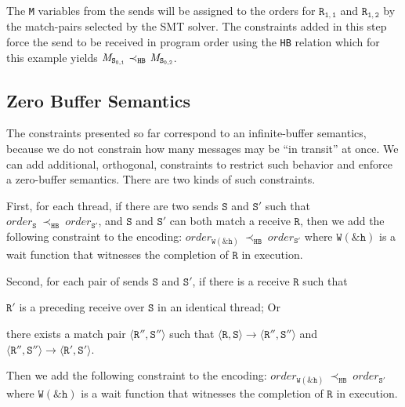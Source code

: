 The \texttt{M} variables from the sends will be assigned to the orders
for $\mathtt{R_{1,1}}$ and $\mathtt{R_{1,2}}$ by the match-pairs
selected by the SMT solver. The constraints added in this step force
the send to be received in program order using the \texttt{HB}
relation which for this example yields
$\cfgnt{M}_\mathtt{S_{0,1}}\ \mathrm{\prec_\mathtt{HB}}\ \cfgnt{M}_\mathtt{S_{0,2}}$.

\subsection{Zero Buffer Semantics}

The constraints presented so far correspond to an infinite-buffer
semantics, because we do not constrain how many messages may be ``in
transit'' at once. We can add additional, orthogonal, constraints to
restrict such behavior and enforce a zero-buffer semantics. There are
two kinds of such constraints.

First, for each thread, if there are two sends $\mathtt{S}$ and
$\mathtt{S'}$ such that
$\mathit{order}_\mathtt{S}\ \mathrm{\prec_\mathtt{HB}}\ \mathit{order}_\mathtt{S'}$,
and $\mathtt{S}$ and $\mathtt{S'}$ can both match a receive
$\mathtt{R}$, then we add the following constraint to the encoding:
$\mathit{order}_{\mathtt{W(\&h)}}\ \mathrm{\prec_{\mathtt{HB}}}\ \mathit{order}_{\mathtt{S'}}$
where $\mathtt{W(\&h)}$ is a wait function that witnesses the
completion of $\mathtt{R}$ in execution.

Second, for each pair of sends $\mathtt{S}$ and $\mathtt{S'}$, if
there is a receive $\mathtt{R}$ such that

\begin{compactenum}
\item $\mathtt{R'}$ is a preceding receive over $\mathtt{S}$ in an
  identical thread; Or

\item there exists a match pair $\langle\mathtt{R''},
  \mathtt{S''}\rangle$ such that $\langle\mathtt{R}, \mathtt{S}\rangle
  \rightarrow \langle\mathtt{R''}, \mathtt{S''}\rangle$ and
  $\langle\mathtt{R''}, \mathtt{S''}\rangle \rightarrow
  \langle\mathtt{R'}, \mathtt{S'}\rangle$.
\end{compactenum}

Then we add the following constraint to the encoding:
$\mathit{order}_{\mathtt{W(\&h)}}\ \mathrm{\prec_{\mathtt{HB}}}\ \mathit{order}_{\mathtt{S'}}$
where $\mathtt{W(\&h)}$ is a wait function that witnesses the
completion of $\mathtt{R}$ in execution.

